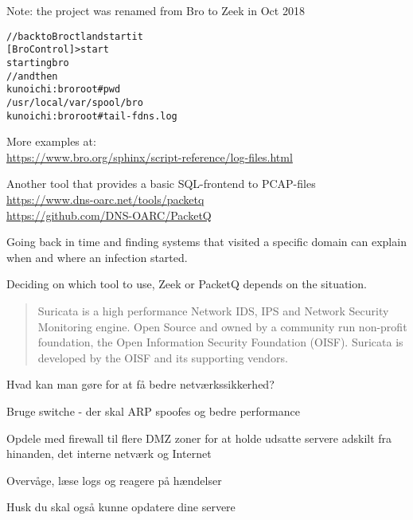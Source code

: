 \documentclass[Screen16to9,17pt]{foils}
\begin{document}
\centerline{Note: the project was renamed from Bro to Zeek in Oct 2018}



\begin{alltt}\small
// back to Broctl and start it
[BroControl] > start
starting bro
// and then
kunoichi:bro root# pwd
/usr/local/var/spool/bro
kunoichi:bro root# tail -f dns.log
\end{alltt}

More examples at:\\
\url{https://www.bro.org/sphinx/script-reference/log-files.html}



Another tool that provides a basic SQL-frontend to PCAP-files\\
\url{https://www.dns-oarc.net/tools/packetq}\\
\url{https://github.com/DNS-OARC/PacketQ}

Going back in time and finding systems that visited a specific domain can explain when and where an infection started.

Deciding on which tool to use, Zeek or PacketQ depends on the situation.



\begin{quote}
Suricata is a high performance Network IDS, IPS and Network Security Monitoring engine. Open Source and owned by a community run non-profit foundation, the Open Information Security Foundation (OISF). Suricata is developed by the OISF and its supporting vendors.
\end{quote}







\myquestionspage




\begin{list1}
\item Hvad kan man gøre for at få bedre netværkssikkerhed?
\begin{list2}
\item Bruge switche - der skal ARP spoofes og bedre performance
\item Opdele med firewall til flere DMZ zoner for at holde
      udsatte servere adskilt fra hinanden, det interne netværk og
      Internet
\item Overvåge, læse logs og reagere på hændelser
\end{list2}
\item Husk du skal også kunne opdatere dine servere
\end{list1}
\end{document}
